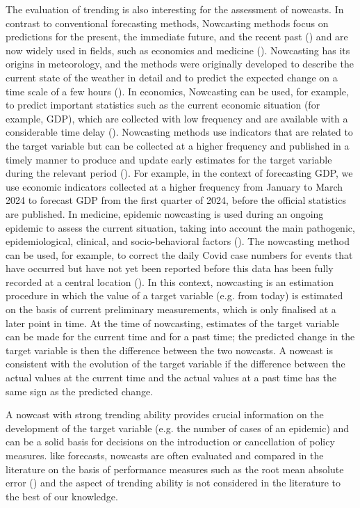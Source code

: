 The evaluation of trending is also interesting for the assessment of nowcasts.
In contrast to conventional forecasting methods, Nowcasting methods focus on predictions for the present, the immediate future, and the recent past (\cite{banbura2013now}) and are now widely used in fields, such as economics and medicine (\cite{bok2018macroeconomic, wolffram2023collaborative}).
Nowcasting has its origins in meteorology, and the methods were originally developed to describe the current state of the weather in detail and to predict the expected change on a time scale of a few hours (\cite{browning1989nowcasting,schmid2019nowcasting}). In economics, Nowcasting can be used, for example, to predict important statistics such as the current economic situation (for example, GDP), which are collected with low frequency and are available with a considerable time delay (\cite{banbura2013now}).
Nowcasting methods use indicators that are related to the target variable but can be collected at a higher frequency and published in a timely manner to produce and update early estimates for the target variable during the relevant period (\cite{castle2017forecasting}). For example, in the context of forecasting GDP, we use economic indicators collected at a higher frequency from January to March 2024 to forecast GDP from the first quarter of 2024, before the official statistics are published.
In medicine, epidemic nowcasting is used during an ongoing epidemic to assess the current situation, taking into account the main pathogenic, epidemiological, clinical, and socio-behavioral factors (\cite{wu2021nowcasting}). 
The nowcasting method can be used, for example, to correct the daily Covid case numbers for events that have occurred but have not yet been reported before this data has been fully recorded at a central location (\cite{gunther2021nowcasting}). 
In this context, nowcasting is an estimation procedure in which the value of a target variable (e.g. from today) is estimated on the basis of current preliminary measurements, which is only finalised at a later point in time. 
At the time of nowcasting, estimates of the target variable can be made for the current time and for a past time; the predicted change in the target variable is then the difference between the two nowcasts.  A nowcast is consistent with the evolution of the target variable if the difference between the actual values at the current time and the actual values at a past time has the same sign as the predicted change.

A nowcast with strong trending ability provides crucial information on the development of the target variable (e.g. the number of cases of an epidemic) and can be a solid basis for decisions on the introduction or cancellation of policy measures. like forecasts, nowcasts are often evaluated and compared in the literature on the basis of performance measures such as the root mean absolute error (\cite{gunther2021nowcasting}) and the aspect of trending ability is not considered in the literature to the best of our knowledge.


